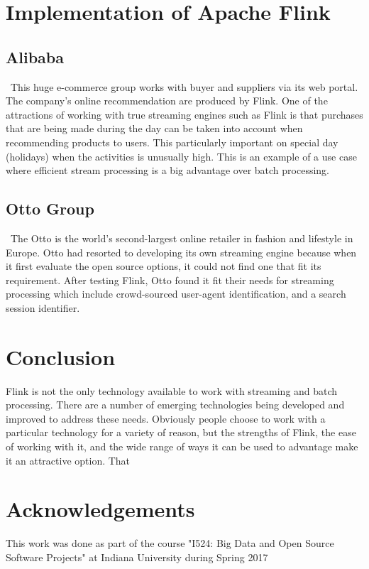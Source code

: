 \documentclass[9pt,twocolumn,twoside]{styles/osajnl}
\begin{document}
\section{Implementation of Apache Flink }
\subsection{Alibaba}
~\cite{book-flink}This huge e-commerce group works with buyer and suppliers via its web portal. The company’s online recommendation are produced by Flink. One of the attractions of working with true streaming engines such as Flink is that purchases that are being made during the day can be taken into account when recommending products to users. This particularly important on special day (holidays) when the activities is unusually high. This is an example of a use case where efficient stream processing is a big advantage over batch processing.

\subsection{Otto Group}
~\cite{book-flink}The Otto is the world’s second-largest online retailer in fashion and lifestyle in Europe.  Otto had resorted to developing its own streaming engine because when it first evaluate the open source options, it could not find one that fit its requirement. After testing Flink, Otto found it fit their needs for streaming processing which include crowd-sourced user-agent identification, and a search session identifier.

\section{Conclusion}
Flink is not the only technology available to work with streaming and batch processing. There are a number of emerging technologies being developed and improved to address these needs. Obviously people choose to work with a particular technology for a variety of reason, but the strengths of Flink, the ease of working with it, and the wide range of ways it can be used to advantage make it an attractive option. That

\section{Acknowledgements}
This work was done as part of the course "I524: Big Data and Open Source Software Projects" at Indiana University during Spring 2017



 
\end{document}
